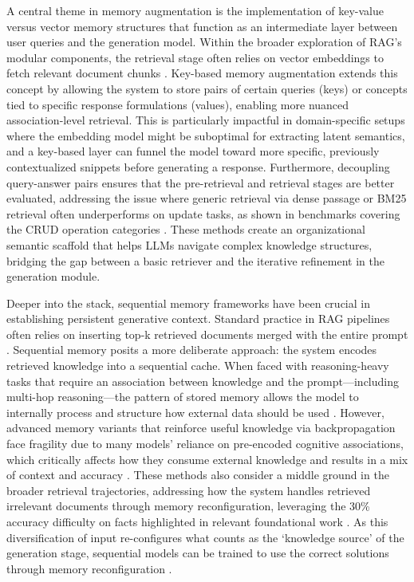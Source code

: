 \documentclass[11pt]{article}
\begin{document}
A central theme in memory augmentation is the implementation of key-value versus vector memory structures that function as an intermediate layer between user queries and the generation model. Within the broader exploration of RAG's modular components, the retrieval stage often relies on vector embeddings to fetch relevant document chunks \cite{ref1}. Key-based memory augmentation extends this concept by allowing the system to store pairs of certain queries (keys) or concepts tied to specific response formulations (values), enabling more nuanced association-level retrieval. This is particularly impactful in domain-specific setups where the embedding model might be suboptimal for extracting latent semantics, and a key-based layer can funnel the model toward more specific, previously contextualized snippets before generating a response. Furthermore, decoupling query-answer pairs ensures that the pre-retrieval and retrieval stages are better evaluated, addressing the issue where generic retrieval via dense passage or BM25 retrieval often underperforms on update tasks, as shown in benchmarks covering the CRUD operation categories \cite{ref51}. These methods create an organizational semantic scaffold that helps LLMs navigate complex knowledge structures, bridging the gap between a basic retriever and the iterative refinement in the generation module.

Deeper into the stack, sequential memory frameworks have been crucial in establishing persistent generative context. Standard practice in RAG pipelines often relies on inserting top-k retrieved documents merged with the entire prompt \cite{ref7}. Sequential memory posits a more deliberate approach: the system encodes retrieved knowledge into a sequential cache. When faced with reasoning-heavy tasks that require an association between knowledge and the prompt---including multi-hop reasoning---the pattern of stored memory allows the model to internally process and structure how external data should be used \cite{ref1}. However, advanced memory variants that reinforce useful knowledge via backpropagation face fragility due to many models' reliance on pre-encoded cognitive associations, which critically affects how they consume external knowledge and results in a mix of context and accuracy \cite{ref7}. These methods also consider a middle ground in the broader retrieval trajectories, addressing how the system handles retrieved irrelevant documents through memory reconfiguration, leveraging the 30\% accuracy difficulty on facts highlighted in relevant foundational work \cite{ref10}. As this diversification of input re-configures what counts as the `knowledge source' of the generation stage, sequential models can be trained to use the correct solutions through memory reconfiguration \cite{ref52}.
\end{document}

